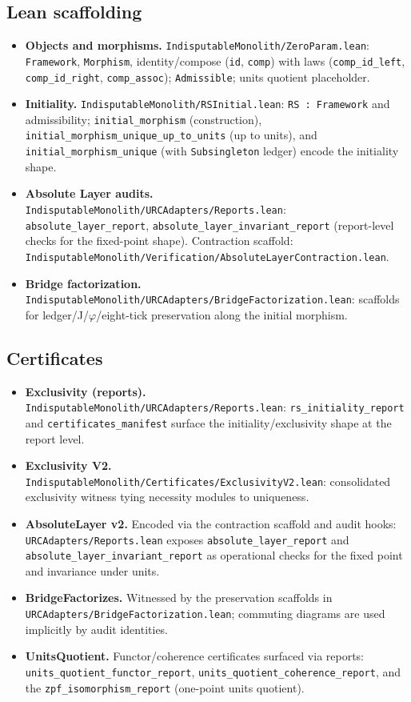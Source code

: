 \documentclass[11pt]{article}
\begin{document}
\subsection{Lean scaffolding}
\begin{itemize}
  \item \textbf{Objects and morphisms.} \texttt{IndisputableMonolith/ZeroParam.lean}: \texttt{Framework}, \texttt{Morphism}, identity/compose (\texttt{id}, \texttt{comp}) with laws (\texttt{comp\_id\_left}, \texttt{comp\_id\_right}, \texttt{comp\_assoc}); \texttt{Admissible}; units quotient placeholder.
  \item \textbf{Initiality.} \texttt{IndisputableMonolith/RSInitial.lean}: \texttt{RS : Framework} and admissibility; \texttt{initial\_morphism} (construction), \texttt{initial\_morphism\_unique\_up\_to\_units} (up to units), and \texttt{initial\_morphism\_unique} (with \texttt{Subsingleton} ledger) encode the initiality shape.
  \item \textbf{Absolute Layer audits.} \texttt{IndisputableMonolith/URCAdapters/Reports.lean}: \texttt{absolute\_layer\_report}, \texttt{absolute\_layer\_invariant\_report} (report\mbox{-}level checks for the fixed\mbox{-}point shape). Contraction scaffold: \texttt{IndisputableMonolith/Verification/AbsoluteLayerContraction.lean}.
  \item \textbf{Bridge factorization.} \texttt{IndisputableMonolith/URCAdapters/BridgeFactorization.lean}: scaffolds for ledger/J/\(\varphi\)/eight\mbox{-}tick preservation along the initial morphism.
\end{itemize}

\subsection{Certificates}
\begin{itemize}
  \item \textbf{Exclusivity (reports).} \texttt{IndisputableMonolith/URCAdapters/Reports.lean}: \texttt{rs\_initiality\_report} and \texttt{certificates\_manifest} surface the initiality/exclusivity shape at the report level.
  \item \textbf{Exclusivity V2.} \texttt{IndisputableMonolith/Certificates/ExclusivityV2.lean}: consolidated exclusivity witness tying necessity modules to uniqueness.
  \item \textbf{AbsoluteLayer v2.} Encoded via the contraction scaffold and audit hooks: \texttt{URCAdapters/Reports.lean} exposes \texttt{absolute\_layer\_report} and \texttt{absolute\_layer\_invariant\_report} as operational checks for the fixed point and invariance under units.
  \item \textbf{BridgeFactorizes.} Witnessed by the preservation scaffolds in \texttt{URCAdapters/BridgeFactorization.lean}; commuting diagrams are used implicitly by audit identities.
  \item \textbf{UnitsQuotient.} Functor/coherence certificates surfaced via reports: \texttt{units\_quotient\_functor\_report}, \texttt{units\_quotient\_coherence\_report}, and the \texttt{zpf\_isomorphism\_report} (one\mbox{-}point units quotient).
\end{itemize}
\end{document}
